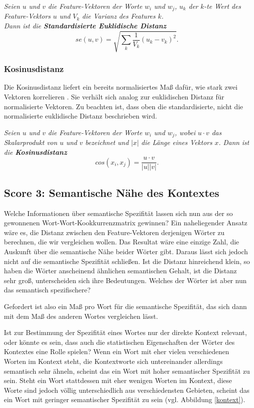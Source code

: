 \documentclass[11pt,numbers=noenddot]{scrartcl}
\begin{document}
\emph{Seien $u$ und $v$ die Feature-Vektoren der Worte $w_i$ und $w_j$, $u_k$ der $k$-te Wert des Feature-Vektors $u$ und $V_k$ die Varianz des Features $k$.\\ Dann ist die \textbf{Standardisierte Euklidische Distanz}}
$$
    se(u, v) = \sqrt{ \sum_{k} {\frac{1}{V_k}{ (u_k - v_k)^2 }} }.
$$

\subsubsection{Kosinusdistanz} \label{cosi}

Die Kosinusdistanz liefert ein bereits normalisiertes Maß dafür, wie stark zwei Vektoren korrelieren \citep[S. 300]{manning1999}. Sie verhält sich analog zur euklidischen Distanz für normalisierte Vektoren. Zu beachten ist, dass oben die standardisierte, nicht die normalisierte euklidische Distanz beschrieben wird.

\emph{Seien $u$ und $v$ die Feature-Vektoren der Worte $w_i$ und $w_j$, wobei $u \cdot v$ das Skalarprodukt von $u$ und $v$ bezeichnet und $|x|$ die Länge eines Vektors $x$. Dann ist die \textbf{Kosinusdistanz}}
$$
    cos(x_i, x_j) = \frac{u \cdot v}{|u||v|}.
$$


\subsection{Score 3: Semantische Nähe des Kontextes} \label{mdcs}

Welche Informationen über semantische Spezifität lassen sich nun aus der so gewonnenen Wort-Wort-Kookkurrenzmatrix gewinnen? Ein naheliegender Ansatz wäre es, die Distanz zwischen den Feature-Vektoren derjenigen Wörter zu berechnen, die wir vergleichen wollen. Das Resultat wäre eine einzige Zahl, die Auskunft über die semantische Nähe beider Wörter gibt. Daraus lässt sich jedoch nicht auf die semantische Spezifität schließen. Ist die Distanz hinreichend klein, so haben die Wörter anscheinend ähnlichen semantischen Gehalt, ist die Distanz sehr groß, unterscheiden sich ihre Bedeutungen. Welches der Wörter ist aber nun das semantisch spezifischere?

Gefordert ist also ein Maß pro Wort für die semantische Spezifität, das sich dann mit dem Maß des anderen Wortes vergleichen lässt.

Ist zur Bestimmung der Spezifität eines Wortes nur der direkte Kontext relevant, oder könnte es sein, dass auch die statistischen Eigenschaften der Wörter des Kontextes eine Rolle spielen? Wenn ein Wort mit eher vielen verschiedenen Worten im Kontext steht, die Kontextworte sich untereinander allerdings semantisch sehr ähneln, scheint das ein Wort mit hoher semantischer Spezifität zu sein. Steht ein Wort stattdessen mit eher wenigen Worten im Kontext, diese Worte sind jedoch völlig unterschiedlich aus verschiedensten Gebieten, scheint das ein Wort mit geringer semantischer Spezifität zu sein (vgl. Abbildung \ref{kontext}).
\end{document}
